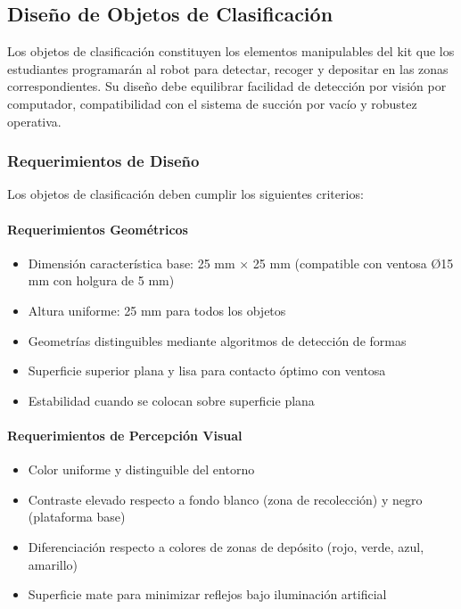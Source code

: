 \subsection{Diseño de Objetos de Clasificación}

Los objetos de clasificación constituyen los elementos manipulables del kit que los estudiantes programarán al robot para detectar, recoger y depositar en las zonas correspondientes. Su diseño debe equilibrar facilidad de detección por visión por computador, compatibilidad con el sistema de succión por vacío y robustez operativa.

\subsubsection{Requerimientos de Diseño}

Los objetos de clasificación deben cumplir los siguientes criterios:

\paragraph{Requerimientos Geométricos}

\begin{itemize}
    \item Dimensión característica base: 25 mm × 25 mm (compatible con ventosa Ø15 mm con holgura de 5 mm)
    \item Altura uniforme: 25 mm para todos los objetos
    \item Geometrías distinguibles mediante algoritmos de detección de formas
    \item Superficie superior plana y lisa para contacto óptimo con ventosa
    \item Estabilidad cuando se colocan sobre superficie plana
\end{itemize}

\paragraph{Requerimientos de Percepción Visual}

\begin{itemize}
    \item Color uniforme y distinguible del entorno
    \item Contraste elevado respecto a fondo blanco (zona de recolección) y negro (plataforma base)
    \item Diferenciación respecto a colores de zonas de depósito (rojo, verde, azul, amarillo)
    \item Superficie mate para minimizar reflejos bajo iluminación artificial
\end{itemize}

